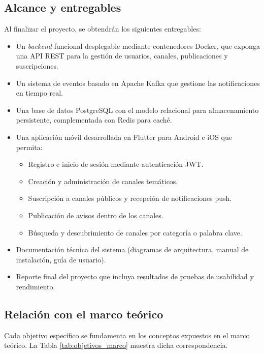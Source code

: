 \subsection{Alcance y entregables}

Al finalizar el proyecto, se obtendrán los siguientes entregables:

\begin{itemize}
    \item Un \textit{backend} funcional desplegable mediante contenedores Docker, que exponga una API REST para la gestión de usuarios, canales, publicaciones y suscripciones.
    \item Un sistema de eventos basado en Apache Kafka que gestione las notificaciones en tiempo real.
    \item Una base de datos PostgreSQL con el modelo relacional para almacenamiento persistente, complementada con Redis para caché.
    \item Una aplicación móvil desarrollada en Flutter para Android e iOS que permita:
    \begin{itemize}
        \item Registro e inicio de sesión mediante autenticación JWT.
        \item Creación y administración de canales temáticos.
        \item Suscripción a canales públicos y recepción de notificaciones push.
        \item Publicación de avisos dentro de los canales.
        \item Búsqueda y descubrimiento de canales por categoría o palabra clave.
    \end{itemize}
    \item Documentación técnica del sistema (diagramas de arquitectura, manual de instalación, guía de usuario).
    \item Reporte final del proyecto que incluya resultados de pruebas de usabilidad y rendimiento.
\end{itemize}

\subsection{Relación con el marco teórico}

Cada objetivo específico se fundamenta en los conceptos expuestos en el marco teórico. La Tabla \ref{tab:objetivos_marco} muestra dicha correspondencia.

